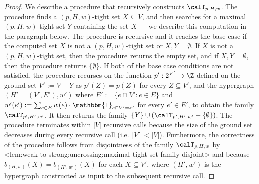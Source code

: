 \documentclass{article}
\def\Cref#1{<#1>}%
\newcommand{\indicator}{\ensuremath{\mathbbm{1}}\xspace}
\newcommand{\maximalTightSetFamily}[1]{\ensuremath{\calT_{#1}}\xspace}
\begin{document}
\lemComputingMaximalTightSetFamily*
\begin{proof}
We describe a procedure that recursively constructs \maximalTightSetFamily{p, H, w}. The procedure finds a $(p, H, w)$-tight set $X\subseteq V$, and then searches for a maximal $(p, H, w)$-tight set $Y$ containing the set $X$ --- we describe this computation in the paragraph below. 
The procedure is recursive and it reaches the base case if 
the computed set $X$ is not a $(p, H, w)$-tight set or $X,Y = \emptyset$. If $X$ is not a $(p, H, w)$-tight set, then the procedure returns the empty set, and if $X,Y = \emptyset$, then the procedure returns $\{\emptyset\}$.
If both of the base case conditions are not satisfied, the procedure recurses on the function $p':2^{V'}\rightarrow\Z$ defined on the ground set $V':=V - Y$ as $p'(Z) = p(Z)$ for every $Z \subseteq V'$, and the hypergraph $(H' = (V', E'), w')$ where $E' := \{e \cap V' : e \in E\}$ and $w'(e'):= \sum_{e \in E}w(e)\cdot\indicator_{e\cap V' = e'}$ for every $e' \in E'$, to obtain the family $\maximalTightSetFamily{p', H', w'}$.
It then returns the family $\{Y\} \cup (\maximalTightSetFamily{p', H', w'} - \{\emptyset\})$. 
The procedure terminates within $|V|$ recursive calls because the size of the ground set decreases during every recursive call (i.e. $|V'| < |V|$). Furthermore, the correctness of the procedure follows from disjointness of the family $\maximalTightSetFamily{p, H, w}$ by \Cref{lem:weak-to-strong:uncrossing:maximal-tight-set-family-disjoint} and because $b_{(H,w)}(X) = b_{(H', w')}(X)$ for each $X \subseteq V'$, where $(H', w')$ is the hypergraph constructed as input to the subsequent recursive call.
    

\end{proof}
\end{document}
